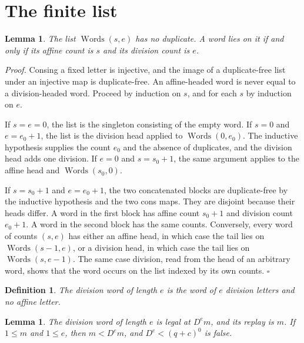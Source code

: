 \documentclass[11pt,letterpaper]{article}
\newtheorem{lemma}[theorem]{Lemma}
\newtheorem{definition}[theorem]{Definition}
\newenvironment{proof}{\noindent\textit{Proof.}}{\hfill\(\square\)}
\begin{document}
\section{The finite list}

\begin{lemma}
\label{lem:list}
The list \(\operatorname{Words}(s,e)\) has no duplicate. A word lies on it if and only if its affine count is \(s\) and its division count is \(e\).
\end{lemma}

\begin{proof}
Consing a fixed letter is injective, and the image of a duplicate-free list under an injective map is duplicate-free. An affine-headed word is never equal to a division-headed word. Proceed by induction on \(s\), and for each \(s\) by induction on \(e\).

If \(s=e=0\), the list is the singleton consisting of the empty word. If \(s=0\) and \(e=e_0+1\), the list is the division head applied to \(\operatorname{Words}(0,e_0)\). The inductive hypothesis supplies the count \(e_0\) and the absence of duplicates, and the division head adds one division. If \(e=0\) and \(s=s_0+1\), the same argument applies to the affine head and \(\operatorname{Words}(s_0,0)\).

If \(s=s_0+1\) and \(e=e_0+1\), the two concatenated blocks are duplicate-free by the inductive hypothesis and the two cons maps. They are disjoint because their heads differ. A word in the first block has affine count \(s_0+1\) and division count \(e_0+1\). A word in the second block has the same counts. Conversely, every word of counts \((s,e)\) has either an affine head, in which case the tail lies on \(\operatorname{Words}(s-1,e)\), or a division head, in which case the tail lies on \(\operatorname{Words}(s,e-1)\). The same case division, read from the head of an arbitrary word, shows that the word occurs on the list indexed by its own counts.
\end{proof}

\begin{definition}
\label{def:tower}
The \emph{division word} of length \(e\) is the word of \(e\) division letters and no affine letter.
\end{definition}

\begin{lemma}
\label{lem:tower}
The division word of length \(e\) is legal at \(D^em\), and its replay is \(m\). If \(1\le m\) and \(1\le e\), then \(m<D^em\), and \(D^e<(q+c)^{0}\) is false.
\end{lemma}
\end{document}
